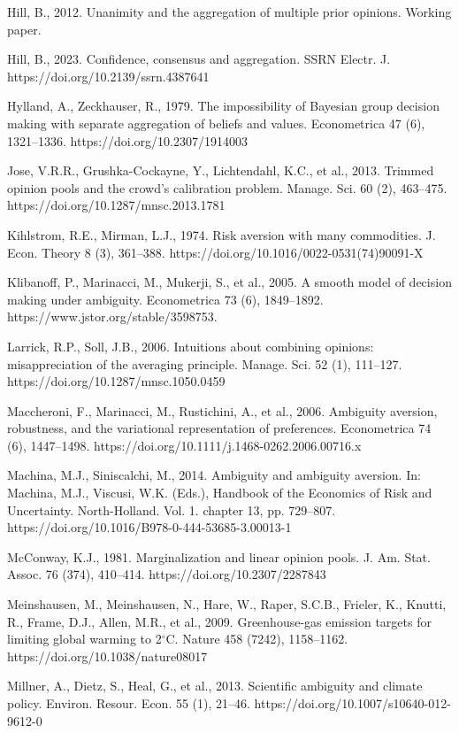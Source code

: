 \documentclass[12pt,a4paper]{article}
\newenvironment{original}
  {\par\noindent\ignorespaces}
  {\par}
\begin{document}
\begin{original}
Hill, B., 2012. Unanimity and the aggregation of multiple prior opinions. Working paper.

Hill, B., 2023. Confidence, consensus and aggregation. SSRN Electr. J. https://doi.org/10.2139/ssrn.4387641

Hylland, A., Zeckhauser, R., 1979. The impossibility of Bayesian group decision making with separate aggregation of beliefs and values. Econometrica 47 (6), 1321--1336. https://doi.org/10.2307/1914003

Jose, V.R.R., Grushka-Cockayne, Y., Lichtendahl, K.C., et al., 2013. Trimmed opinion pools and the crowd's calibration problem. Manage. Sci. 60 (2), 463--475. https://doi.org/10.1287/mnsc.2013.1781

Kihlstrom, R.E., Mirman, L.J., 1974. Risk aversion with many commodities. J. Econ. Theory 8 (3), 361--388. https://doi.org/10.1016/0022-0531(74)90091-X

Klibanoff, P., Marinacci, M., Mukerji, S., et al., 2005. A smooth model of decision making under ambiguity. Econometrica 73 (6), 1849--1892. https://www.jstor.org/stable/3598753.

Larrick, R.P., Soll, J.B., 2006. Intuitions about combining opinions: misappreciation of the averaging principle. Manage. Sci. 52 (1), 111--127. https://doi.org/10.1287/mnsc.1050.0459

Maccheroni, F., Marinacci, M., Rustichini, A., et al., 2006. Ambiguity aversion, robustness, and the variational representation of preferences. Econometrica 74 (6), 1447--1498. https://doi.org/10.1111/j.1468-0262.2006.00716.x

Machina, M.J., Siniscalchi, M., 2014. Ambiguity and ambiguity aversion. In: Machina, M.J., Viscusi, W.K. (Eds.), Handbook of the Economics of Risk and Uncertainty. North-Holland. Vol. 1. chapter 13, pp. 729--807. https://doi.org/10.1016/B978-0-444-53685-3.00013-1

McConway, K.J., 1981. Marginalization and linear opinion pools. J. Am. Stat. Assoc. 76 (374), 410--414. https://doi.org/10.2307/2287843

Meinshausen, M., Meinshausen, N., Hare, W., Raper, S.C.B., Frieler, K., Knutti, R., Frame, D.J., Allen, M.R., et al., 2009. Greenhouse-gas emission targets for limiting global warming to 2${}^{\circ}$C. Nature 458 (7242), 1158--1162. https://doi.org/10.1038/nature08017

Millner, A., Dietz, S., Heal, G., et al., 2013. Scientific ambiguity and climate policy. Environ. Resour. Econ. 55 (1), 21--46. https://doi.org/10.1007/s10640-012-9612-0


\end{original}
\end{document}
